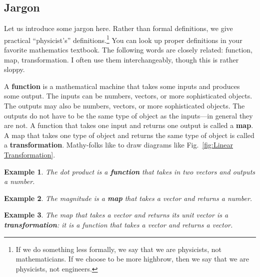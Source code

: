 \documentclass[12pt]{article}
\newtheorem{example}{Example}[section]
\begin{document}
\subsection{Jargon}
Let us introduce some jargon here. Rather than formal definitions, we give practical ``physicist's'' definitions.\footnote{If we do something less formally, we say that we are physicists, not mathematicians. If we choose to be more highbrow, then we say that we are physicists, not engineers.} You can look up proper definitions in your favorite mathematics textbook.  The following words are closely related: function, map, transformation. I often use them interchangeably, though this is rather sloppy.  

A \textbf{function} is a mathematical machine that takes some inputs and produces some output. The inputs can be numbers, vectors, or more sophisticated objects. The outputs may also be numbers, vectors, or more sophisticated objects. The outputs do not have to be the same type of object as the inputs---in general they are not.
% 
A function that takes one input and returns one output is called a \textbf{map}. 
% 
A map that takes one type of object and returns the same type of object is called a \textbf{transformation}. Mathy-folks like to draw diagrams like Fig.~\ref{fig:Linear Transformation}.

\begin{example}
The dot product is a \textbf{function} that takes in two vectors and outputs a number.
\end{example}
\begin{example}
The magnitude is a \textbf{map} that takes a vector and returns a number.
\end{example}
\begin{example}
The map that takes a vector and returns its unit vector is a \textbf{transformation}: it is a function that takes a vector and returns a vector.
\end{example}
\end{document}
